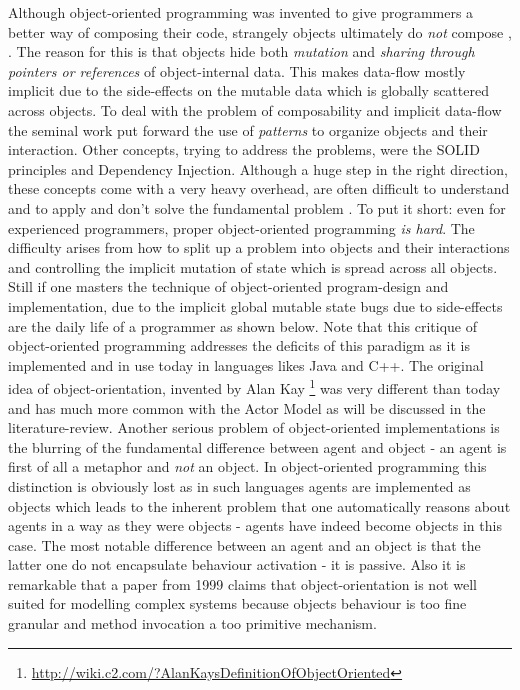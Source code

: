 Although object-oriented programming was invented to give programmers a better way of composing their code, strangely objects ultimately do \textit{not} compose \cite{bill_what_2017}, \cite{erkki_lindpere_why_2013}. The reason for this is that objects hide both \textit{mutation} and \textit{sharing through pointers or references} of object-internal data. This makes data-flow mostly implicit due to the side-effects on the mutable data which is globally scattered across objects. To deal with the problem of composability and implicit data-flow the seminal work \cite{gamma_design_1994} put forward the use of \textit{patterns} to organize objects and their interaction. Other concepts, trying to address the problems, were the SOLID principles and Dependency Injection. Although a huge step in the right direction, these concepts come with a very heavy overhead, are often difficult to understand and to apply and don't solve the fundamental problem \cite{lawrence_krubner_object_2014}. To put it short: even for experienced programmers, proper object-oriented programming \textit{is hard}. The difficulty arises from how to split up a problem into objects and their interactions and controlling the implicit mutation of state which is spread across all objects. Still if one masters the technique of object-oriented program-design and implementation, due to the implicit global mutable state bugs due to side-effects are the daily life of a programmer as shown below. Note that this critique of object-oriented programming addresses the deficits of this paradigm as it is implemented and in use today in languages likes Java and C++. The original idea of object-orientation, invented by Alan Kay \footnote{\url{http://wiki.c2.com/?AlanKaysDefinitionOfObjectOriented}} was very different than today and has much more common with the Actor Model as will be discussed in the literature-review.
Another serious problem of object-oriented implementations is the blurring of the fundamental difference between agent and object - an agent is first of all a metaphor and \textit{not} an object. In object-oriented programming this distinction is obviously lost as in such languages agents are implemented as objects which leads to the inherent problem that one automatically reasons about agents in a way as they were objects - agents have indeed become objects in this case. The most notable difference between an agent and an object is that the latter one do not encapsulate behaviour activation \cite{jennings_agent-based_2000} - it is passive. Also it is remarkable that \cite{jennings_agent-based_2000} a paper from 1999 claims that object-orientation is not well suited for modelling complex systems because objects behaviour is too fine granular and method invocation a too primitive mechanism.

